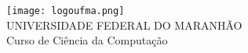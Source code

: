\documentclass[
12pt,				%
openright,			%
oneside,			%
a4paper,			%
english,			%
french,				%
spanish,			%
brazil				%
]{abntex2}
\begin{document}
\frenchspacing 



\renewcommand{\imprimircapa}{%
\begin{capa}%
\center
\texttt{[image: logoufma.png]} \\ 
\vspace{1cm}
\ABNTEXchapterfont\Large UNIVERSIDADE FEDERAL DO MARANHÃO \\
\ABNTEXsectionfont\Large Curso de Ciência da Computação \\

\vspace*{5cm}

\begin{center}
{\ABNTEXsectionfont\Large\imprimirautor} \\
\vfill
\ABNTEXchapterfont\bfseries\LARGE\imprimirtitulo
\end{center}
\vfill
\large\imprimirlocal \\
\large\imprimirdata
\vspace*{1cm}
\end{capa}
}	

\imprimircapa


\imprimirfolhaderosto



%


\end{document}
